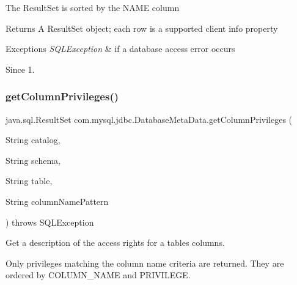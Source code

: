 The {\ttfamily Result\+Set} is sorted by the N\+A\+ME column 

\begin{DoxyReturn}{Returns}
A {\ttfamily Result\+Set} object; each row is a supported client info property 
\end{DoxyReturn}

\begin{DoxyExceptions}{Exceptions}
{\em S\+Q\+L\+Exception} & if a database access error occurs \\
\hline
\end{DoxyExceptions}
\begin{DoxySince}{Since}
1. 
\end{DoxySince}
\mbox{\label{classcom_1_1mysql_1_1jdbc_1_1_database_meta_data_aad5669e55c0db83ec88a8fd9c34a406c}} 
\subsubsection{\texorpdfstring{get\+Column\+Privileges()}{getColumnPrivileges()}}
{\footnotesize\ttfamily java.\+sql.\+Result\+Set com.\+mysql.\+jdbc.\+Database\+Meta\+Data.\+get\+Column\+Privileges (\begin{DoxyParamCaption}\item[{String}]{catalog,  }\item[{String}]{schema,  }\item[{String}]{table,  }\item[{String}]{column\+Name\+Pattern }\end{DoxyParamCaption}) throws S\+Q\+L\+Exception}

Get a description of the access rights for a table\textquotesingle{}s columns. 

Only privileges matching the column name criteria are returned. They are ordered by C\+O\+L\+U\+M\+N\+\_\+\+N\+A\+ME and P\+R\+I\+V\+I\+L\+E\+GE. 

